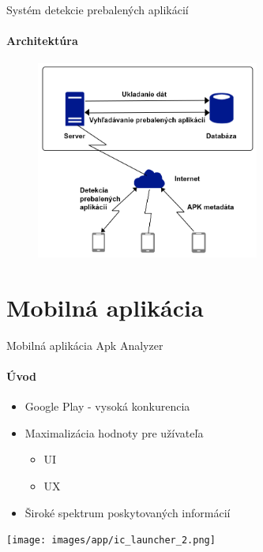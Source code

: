 \documentclass{beamer}
\begin{document}
  \begin{frame}[label=lists]{Systém detekcie prebalených aplikácií}
 	 \framesubtitle{Architektúra}
	\begin{figure}[htb]
	  	\begin{center}
    		\includegraphics[height=6.5cm]{images/system-overview.png}
  		\end{center}
	\end{figure}
  \end{frame}   
  
  \section{Mobilná aplikácia}    
  \begin{frame}[label=lists]{Mobilná aplikácia Apk Analyzer}
 	 \framesubtitle{Úvod}
	\begin{minipage}[htb]{\textwidth}
		\begin{minipage}[t]{0.5\textwidth}
			\begin{itemize}
				\item Google Play - vysoká konkurencia
				\item Maximalizácia hodnoty pre užívateľa
				\begin{itemize}
					\item UI
					\item UX
				\end{itemize}
				\item Široké spektrum poskytovaných informácií
			\end{itemize}
     		\vfill
		\end{minipage}%
	\hfill
	\centering
		\begin{minipage}[t][][b]{0.4\textwidth}
		\centering
		\texttt{[image: images/app/ic\_launcher\_2.png]}
		\label{fig:app-list}
		\end{minipage}%
	\end{minipage}
  \end{frame}   
     
\end{document}
